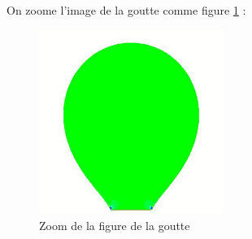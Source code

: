 \documentclass[a4paper]{report}
\begin{document}
\newpage
On zoome l'image de la goutte comme figure \ref{zoom} :
\begin{figure}[h!] 
\begin{center}
\includegraphics[width=6cm]{4_1_1_zoom}
\caption{Zoom de la figure de la goutte}
\label{zoom}
\end{center}
\end{figure}
\end{document}

